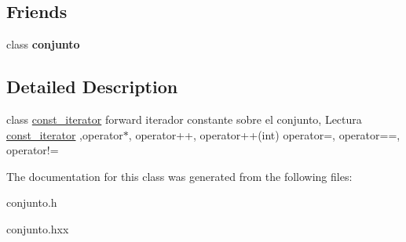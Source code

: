 \subsection*{Friends}
\begin{DoxyCompactItemize}
\item 
\hypertarget{classconjunto_1_1const__iterator_a42fdcda39c77eabd7380e29fcdbe5dd2}{}class {\bfseries conjunto}\label{classconjunto_1_1const__iterator_a42fdcda39c77eabd7380e29fcdbe5dd2}

\end{DoxyCompactItemize}


\subsection{Detailed Description}
class \hyperlink{classconjunto_1_1const__iterator}{const\+\_\+iterator} forward iterador constante sobre el conjunto, Lectura \hyperlink{classconjunto_1_1const__iterator}{const\+\_\+iterator} ,operator$\ast$, operator++, operator++(int) operator=, operator==, operator!= 

The documentation for this class was generated from the following files\+:\begin{DoxyCompactItemize}
\item 
conjunto.\+h\item 
conjunto.\+hxx\end{DoxyCompactItemize}
